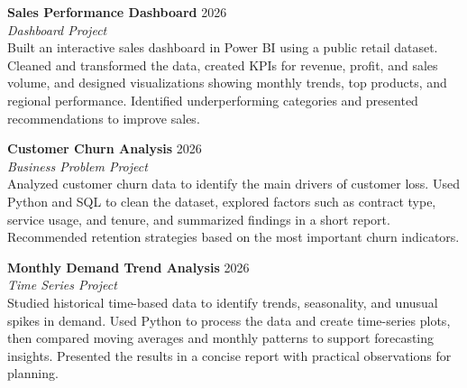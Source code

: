 \documentclass[11pt,a4paper]{article}
\newcommand{\cvproject}[4]{
	\textbf{#1} \hfill #2 \\
	\textit{#3} \\
	#4
}
\begin{document}
	\cvproject
	{Sales Performance Dashboard}
	{2026}
	{Dashboard Project}
	{Built an interactive sales dashboard in Power BI using a public retail dataset. Cleaned and transformed the data, created KPIs for revenue, profit, and sales volume, and designed visualizations showing monthly trends, top products, and regional performance. Identified underperforming categories and presented recommendations to improve sales.}
	
	\vspace{0.5em}
	
	\cvproject
	{Customer Churn Analysis}
	{2026}
	{Business Problem Project}
	{Analyzed customer churn data to identify the main drivers of customer loss. Used Python and SQL to clean the dataset, explored factors such as contract type, service usage, and tenure, and summarized findings in a short report. Recommended retention strategies based on the most important churn indicators.}
	
	\vspace{0.5em}
	
	\cvproject
	{Monthly Demand Trend Analysis}
	{2026}
	{Time Series Project}
	{Studied historical time-based data to identify trends, seasonality, and unusual spikes in demand. Used Python to process the data and create time-series plots, then compared moving averages and monthly patterns to support forecasting insights. Presented the results in a concise report with practical observations for planning.}
	
\end{document}
